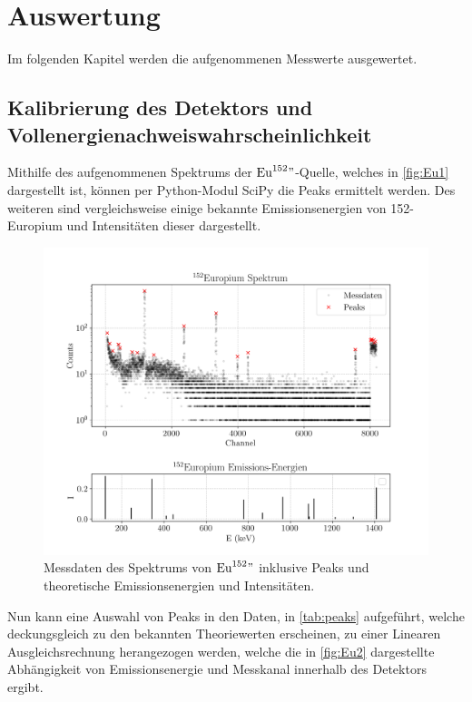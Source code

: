 \section{Auswertung}\label{sec:auswertung}
Im folgenden Kapitel werden die aufgenommenen Messwerte ausgewertet.
\subsection{Kalibrierung des Detektors und Vollenergienachweiswahrscheinlichkeit}
Mithilfe des aufgenommenen Spektrums der $\text{Eu}^{152}"$-Quelle, welches in \autoref{fig:Eu1} dargestellt ist, können per Python-Modul SciPy die Peaks ermittelt werden. Des weiteren sind vergleichsweise einige bekannte Emissionsenergien von 152-Europium und Intensitäten dieser dargestellt.
\begin{figure}[H]
    \centering
    \includegraphics[scale=0.65]{Skripte/152Europium_with_emission.png}
    \caption{Messdaten des Spektrums von $\text{Eu}^{152}"$ inklusive Peaks und theoretische Emissionsenergien und Intensitäten.\cite{iaea1991}}
    \label{fig:Eu1}
  \end{figure}
Nun kann eine Auswahl von Peaks in den Daten, in \autoref{tab:peaks} aufgeführt, welche deckungsgleich zu den bekannten Theoriewerten erscheinen, zu einer Linearen Ausgleichsrechnung herangezogen werden, welche die in \autoref{fig:Eu2} dargestellte Abhängigkeit von Emissionsenergie und Messkanal innerhalb des Detektors ergibt.
